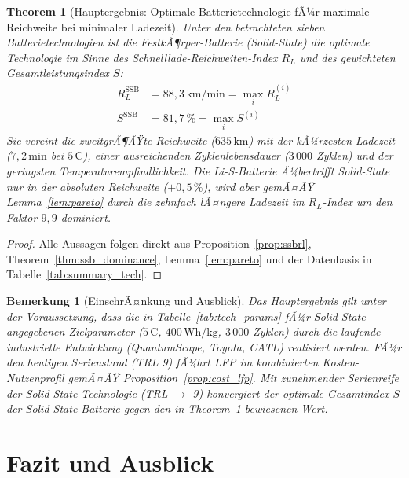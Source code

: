 ﻿\documentclass[12pt,a4paper]{article}
\newtheorem{theorem}{Theorem}[section]
\newtheorem{remark}{Bemerkung}[section]
\begin{document}
	\begin{theorem}[Hauptergebnis: Optimale Batterietechnologie fÃ¼r maximale
	               Reichweite bei minimaler Ladezeit]
		\label{thm:main_result}
		Unter den betrachteten sieben Batterietechnologien ist die
		\emph{FestkÃ¶rper-Batterie (Solid-State)} die optimale Technologie
		im Sinne des Schnelllade-Reichweiten-Index $R_L$ und des
		gewichteten Gesamtleistungsindex $S$:
		\begin{align}
			R_L^{\mathrm{SSB}} &= 88{,}3\,\mathrm{km/min} =
			\max_i R_L^{(i)}
			\label{eq:main_rl} \\
			S^{\mathrm{SSB}} &= 81{,}7\,\% =
			\max_i S^{(i)}
			\label{eq:main_s}
		\end{align}
		Sie vereint die zweitgrÃ¶ÃŸte Reichweite ($635\,\mathrm{km}$) mit
		der kÃ¼rzesten Ladezeit ($7{,}2\,\mathrm{min}$ bei $5\,\mathrm{C}$),
		einer ausreichenden Zyklenlebensdauer ($3\,000$ Zyklen) und der
		geringsten Temperaturempfindlichkeit. Die Li-S-Batterie Ã¼bertrifft
		Solid-State nur in der absoluten Reichweite ($+0{,}5\,\%$), wird
		aber gemÃ¤ÃŸ Lemma~\ref{lem:pareto} durch die zehnfach lÃ¤ngere
		Ladezeit im $R_L$-Index um den Faktor $9{,}9$ dominiert.
	\end{theorem}

	\begin{proof}
		Alle Aussagen folgen direkt aus Proposition~\ref{prop:ssbrl},
		Theorem~\ref{thm:ssb_dominance}, Lemma~\ref{lem:pareto} und
		der Datenbasis in Tabelle~\ref{tab:summary_tech}.
	\end{proof}

	\begin{remark}[EinschrÃ¤nkung und Ausblick]
		Das Hauptergebnis gilt unter der Voraussetzung, dass die in
		Tabelle~\ref{tab:tech_params} fÃ¼r Solid-State angegebenen
		Zielparameter ($5\,\mathrm{C}$, $400\,\mathrm{Wh/kg}$,
		$3\,000$ Zyklen) durch die laufende industrielle Entwicklung
		(QuantumScape, Toyota, CATL) realisiert werden. FÃ¼r den heutigen
		Serienstand (TRL 9) fÃ¼hrt LFP im kombinierten Kosten-Nutzenprofil
		gemÃ¤ÃŸ Proposition~\ref{prop:cost_lfp}. Mit zunehmender
		Serienreife der Solid-State-Technologie (TRL $\to$ 9) konvergiert
		der optimale Gesamtindex $S$ der Solid-State-Batterie gegen den
		in Theorem~\ref{thm:main_result} bewiesenen Wert.
	\end{remark}

	\section{Fazit und Ausblick}
	\label{sec:fazit}
\end{document}
